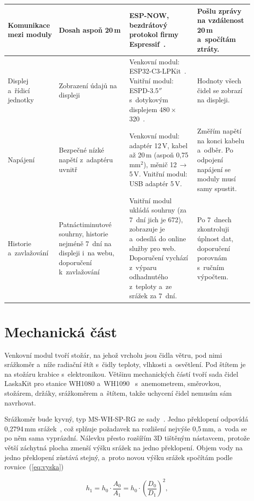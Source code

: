\begin{table}[!t]
{\begin{tabularx}{\textwidth}{|Z{0.62}|Z{0.78}|Z{1.5}|Z{1.1}|}
\hline
Komunikace mezi moduly & Dosah aspoň 20\,m & ESP-NOW, bezdrátový protokol firmy Espressif~\cite{espnow}. & Pošlu zprávy na vzdálenost 20\,m a~spočítám ztráty. \\
\hline
Displej a~řídicí jednotky & Zobrazení údajů na displeji & Venkovní modul: ESP32-C3-LPKit~\cite{esp32c3lpkit}. Vnitřní modul: ESPD-3.5$''$ s~dotykovým displejem 480\,$\times$\,320~\cite{espd}. & Hodnoty všech čidel se zobrazí na displeji. \\
\hline
Napájení & Bezpečné nízké napětí z~adaptéru uvnitř & Venkovní modul: adaptér 12\,V, kabel až 20\,m (aspoň 0,75\,mm$^2$), měnič 12\,$\rightarrow$\,5\,V. Vnitřní modul: USB adaptér 5\,V. & Změřím napětí na konci kabelu a~odběr. Po odpojení napájení se moduly musí samy spustit. \\
\hline
Historie a~zavlažování & Patnáctiminutové souhrny, historie nejméně 7~dní na displeji i~na webu, doporučení k~zavlažování & Vnitřní modul ukládá souhrny (za 7~dní jich je 672), zobrazuje je a~odesílá do online služby pro web. Doporučení vychází z~výparu odhadnutého z~teploty a~ze srážek za 7~dní. & Po 7~dnech zkontroluji úplnost dat, doporučení porovnám s~ručním výpočtem. \\
\hline
\end{tabularx}}
\end{table}

\section{Mechanická část}

Venkovní modul tvoří stožár, na jehož vrcholu jsou čidla větru, pod nimi srážkoměr a~níže radiační štít s~čidly teploty, vlhkosti a~osvětlení. Pod štítem je na stožáru krabice s~elektronikou. Většinu mechanických částí tvoří sada čidel LaskaKit pro stanice WH1080 a~WH1090~\cite{sadacidel} s~anemometrem, směrovkou, stožárem, držáky, srážkoměrem a~štítem, takže uchycení čidel nemusím sám navrhovat.

Srážkoměr bude kyvný, typ MS-WH-SP-RG ze sady~\cite{sadacidel}. Jedno překlopení odpovídá 0,2794\,mm srážek~\cite{srazkomerrg}, což splňuje požadavek na rozlišení nejvýše 0,5\,mm, a~voda se po něm sama vyprázdní. Nálevku přesto rozšířím 3D tištěným nástavcem, protože větší záchytná plocha zmenší výšku srážek na jedno překlopení. Objem vody na jedno překlopení zůstává stejný, a~proto novou výšku srážek spočítám podle rovnice~(\ref{eq:vyska})

\begin{equation}
h_1 = h_0 \cdot \frac{A_0}{A_1} = h_0 \cdot \left(\frac{D_0}{D_1}\right)^2,
\label{eq:vyska}
\end{equation}

